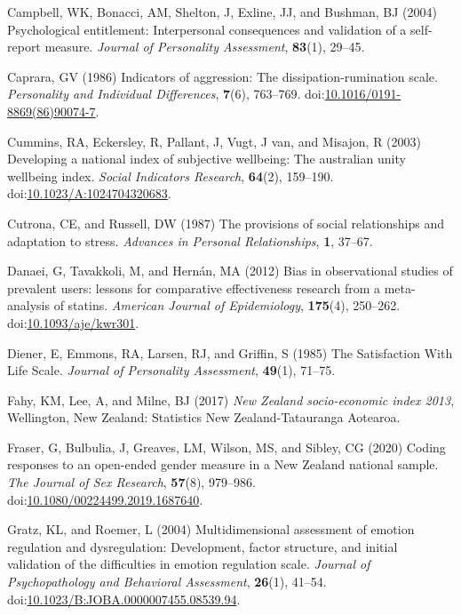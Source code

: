 \documentclass[
  singlecolumn,
  9pt]{article}
\newlength{\cslhangindent}
\newenvironment{CSLReferences}[2] %
 {\begin{list}{}{%
  \setlength{\itemindent}{0pt}
  \setlength{\leftmargin}{0pt}
  \setlength{\parsep}{0pt}
  \ifodd #1
   \setlength{\leftmargin}{\cslhangindent}
   \setlength{\itemindent}{-1\cslhangindent}
  \fi
  \setlength{\itemsep}{#2\baselineskip}}}
 {\end{list}}
\begin{document}
\begin{CSLReferences}{1}{0}
Campbell, WK, Bonacci, AM, Shelton, J, Exline, JJ, and Bushman, BJ
(2004) Psychological entitlement: Interpersonal consequences and
validation of a self-report measure. \emph{Journal of Personality
Assessment}, \textbf{83}(1), 29--45.

Caprara, GV (1986) Indicators of aggression: The dissipation-rumination
scale. \emph{Personality and Individual Differences}, \textbf{7}(6),
763--769.
doi:\href{https://doi.org/10.1016/0191-8869(86)90074-7}{10.1016/0191-8869(86)90074-7}.

Cummins, RA, Eckersley, R, Pallant, J, Vugt, J van, and Misajon, R
(2003) Developing a national index of subjective wellbeing: The
australian unity wellbeing index. \emph{Social Indicators Research},
\textbf{64}(2), 159--190.
doi:\href{https://doi.org/10.1023/A:1024704320683}{10.1023/A:1024704320683}.

Cutrona, CE, and Russell, DW (1987) The provisions of social
relationships and adaptation to stress. \emph{Advances in Personal
Relationships}, \textbf{1}, 37--67.

Danaei, G, Tavakkoli, M, and Hernán, MA (2012) Bias in observational
studies of prevalent users: lessons for comparative effectiveness
research from a meta-analysis of statins. \emph{American Journal of
Epidemiology}, \textbf{175}(4), 250--262.
doi:\href{https://doi.org/10.1093/aje/kwr301}{10.1093/aje/kwr301}.

Diener, E, Emmons, RA, Larsen, RJ, and Griffin, S (1985) The
Satisfaction With Life Scale. \emph{Journal of Personality Assessment},
\textbf{49}(1), 71--75.

Fahy, KM, Lee, A, and Milne, BJ (2017) \emph{New Zealand socio-economic
index 2013}, Wellington, New Zealand: Statistics New Zealand-Tatauranga
Aotearoa.

Fraser, G, Bulbulia, J, Greaves, LM, Wilson, MS, and Sibley, CG (2020)
Coding responses to an open-ended gender measure in a {N}ew {Z}ealand
national sample. \emph{The Journal of Sex Research}, \textbf{57}(8),
979--986.
doi:\href{https://doi.org/10.1080/00224499.2019.1687640}{10.1080/00224499.2019.1687640}.

Gratz, KL, and Roemer, L (2004) Multidimensional assessment of emotion
regulation and dysregulation: Development, factor structure, and initial
validation of the difficulties in emotion regulation scale.
\emph{Journal of Psychopathology and Behavioral Assessment},
\textbf{26}(1), 41--54.
doi:\href{https://doi.org/10.1023/B:JOBA.0000007455.08539.94}{10.1023/B:JOBA.0000007455.08539.94}.


\end{CSLReferences}
\end{document}

